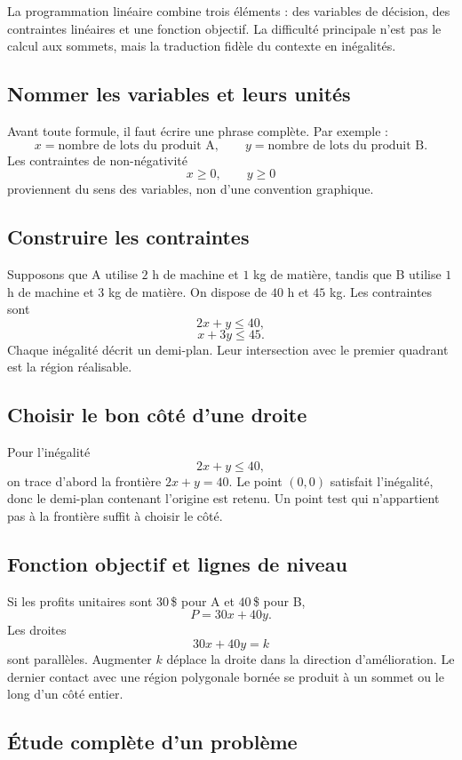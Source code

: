 \documentclass[12pt,a4paper,openany]{book}
\begin{document}
La programmation linéaire combine trois éléments : des variables de décision, des contraintes linéaires et une fonction objectif. La difficulté principale n'est pas le calcul aux sommets, mais la traduction fidèle du contexte en inégalités.

\subsection{Nommer les variables et leurs unités}

Avant toute formule, il faut écrire une phrase complète. Par exemple :
\[
x=\text{nombre de lots du produit A},
\qquad
 y=\text{nombre de lots du produit B}.
\]
Les contraintes de non-négativité
\[
x\geq0,
\qquad y\geq0
\]
proviennent du sens des variables, non d'une convention graphique.

\subsection{Construire les contraintes}

Supposons que A utilise $2$ h de machine et $1$ kg de matière, tandis que B utilise $1$ h de machine et $3$ kg de matière. On dispose de $40$ h et $45$ kg. Les contraintes sont
\[
2x+y\leq40,
\]
\[
x+3y\leq45.
\]
Chaque inégalité décrit un demi-plan. Leur intersection avec le premier quadrant est la région réalisable.

\subsection{Choisir le bon côté d'une droite}

Pour l'inégalité
\[
2x+y\leq40,
\]
on trace d'abord la frontière $2x+y=40$. Le point $(0,0)$ satisfait l'inégalité, donc le demi-plan contenant l'origine est retenu. Un point test qui n'appartient pas à la frontière suffit à choisir le côté.

\subsection{Fonction objectif et lignes de niveau}

Si les profits unitaires sont $30\,$\$ pour A et $40\,$\$ pour B,
\[
P=30x+40y.
\]
Les droites
\[
30x+40y=k
\]
sont parallèles. Augmenter $k$ déplace la droite dans la direction d'amélioration. Le dernier contact avec une région polygonale bornée se produit à un sommet ou le long d'un côté entier.

\subsection{Étude complète d'un problème}
\end{document}
